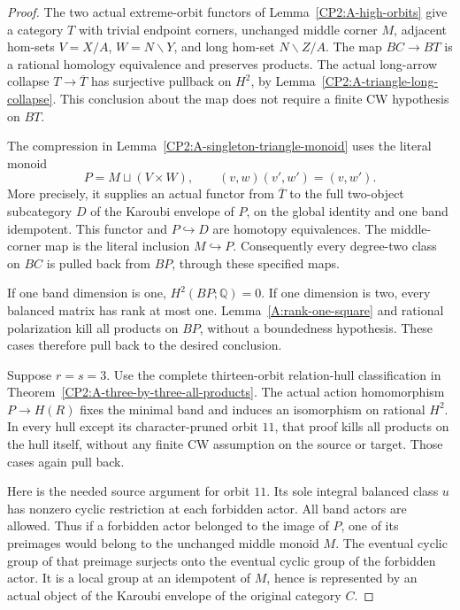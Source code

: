 \begin{proof}
The two actual extreme-orbit functors of
Lemma~\ref{CP2:A-high-orbits} give a category $T$ with trivial
endpoint corners, unchanged middle corner $M$, adjacent hom-sets
$V=X/A$, $W=N\backslash Y$, and long hom-set
$N\backslash Z/A$. The map $BC\to BT$ is a rational homology
equivalence and preserves products. The actual long-arrow
collapse $T\to\overline T$ has surjective pullback on $H^2$,
by Lemma~\ref{CP2:A-triangle-long-collapse}. This conclusion
about the map does not require a finite CW hypothesis on $BT$.

The compression in Lemma~\ref{CP2:A-singleton-triangle-monoid}
uses the literal monoid
\[
 P=M\sqcup(V\times W),
 \qquad (v,w)(v',w')=(v,w').
\]
More precisely, it supplies an actual functor from
$\overline T$ to the full two-object subcategory $D$ of the
Karoubi envelope of $P$, on the global identity and one band
idempotent. This functor and $P\hookrightarrow D$ are homotopy
equivalences. The middle-corner map is the literal inclusion
$M\hookrightarrow P$. Consequently every degree-two class on
$BC$ is pulled back from $BP$, through these specified maps.

If one band dimension is one, $H^2(BP;\mathbb Q)=0$. If one
dimension is two, every balanced matrix has rank at most one.
Lemma~\ref{A:rank-one-square} and rational polarization kill
all products on $BP$, without a boundedness hypothesis. These
cases therefore pull back to the desired conclusion.

Suppose $r=s=3$. Use the complete thirteen-orbit relation-hull
classification in Theorem~\ref{CP2:A-three-by-three-all-products}.
The actual action homomorphism $P\to H(R)$ fixes the minimal
band and induces an isomorphism on rational $H^2$. In every
hull except its character-pruned orbit $11$, that proof kills
all products on the hull itself, without any finite CW
assumption on the source or target. Those cases again pull back.

Here is the needed source argument for orbit $11$. Its sole
integral balanced class $u$ has nonzero cyclic restriction at
each forbidden actor. All band actors are allowed. Thus if a
forbidden actor belonged to the image of $P$, one of its
preimages would belong to the unchanged middle monoid $M$.
The eventual cyclic group of that preimage surjects onto the
eventual cyclic group of the forbidden actor. It is a local
group at an idempotent of $M$, hence is represented by an actual
object of the Karoubi envelope of the original category $C$.


\end{proof}
